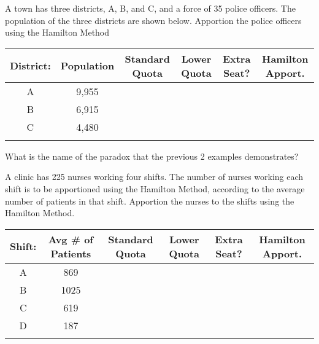 \documentclass[11pt,epsfig]{article}
\begin{document}
\begin{problem}{20}
A town has three districts, A, B, and C, and a force of 35 police officers. The population of the three districts are shown below. Apportion the police officers using the Hamilton Method
 \begin{center}
 \begin{tabular}{ | c | c | c | c | c | c |}
   \hline
   District: & Population & Standard Quota & Lower Quota & Extra Seat? & Hamilton Apport.\\ \hline
   A & 9,955 &  &  &  &  \\ \hline
   B & 6,915 &  &  &  &  \\ \hline
   C & 4,480 &  &  &  &  \\ \hline
    &  &  &  &  &  \\ \hline
   \end{tabular}
  \end{center}

\vfill
\end{problem}

\begin{problem}{10}
What is the name of the paradox that the previous 2 examples demonstrates?

\vfill
\end{problem}

\newpage

\begin{problem}{20}
A clinic has 225 nurses working four shifts. The number of nurses working each shift is to be apportioned using the Hamilton Method, according to the average number of patients in that shift. Apportion the nurses to the shifts using the Hamilton Method.

 \begin{center}
 \begin{tabular}{ | c | c | c | c | c | c |}
   \hline
   Shift: & Avg \# of Patients & Standard Quota & Lower Quota & Extra Seat? & Hamilton Apport.\\ \hline
   A & 869 &  &  &  &  \\ \hline
   B & 1025 &  &  &  &  \\ \hline
   C & 619 &  &  &  &  \\ \hline
   D & 187 &  &  &  &  \\ \hline
    &  &  &  &  &  \\ \hline
   \end{tabular}
  \end{center}

\vfill
\end{problem}
\end{document}
